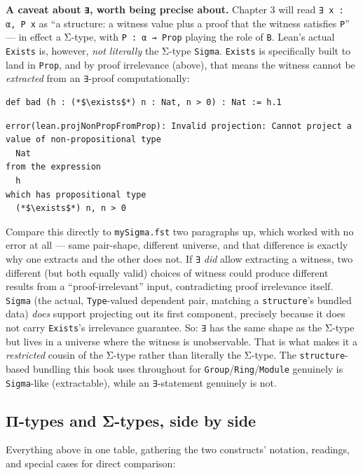 \textbf{A caveat about \texttt{∃}, worth being precise about.} Chapter 3 will read \texttt{∃ x : α, P x} as ``a structure: a witness value plus a proof that the witness satisfies \texttt{P}'' --- in effect a Σ-type, with \texttt{P : α → Prop} playing the role of \texttt{B}. Lean's actual \texttt{Exists} is, however, \emph{not literally} the Σ-type \texttt{Sigma}. \texttt{Exists} is specifically built to land in \texttt{Prop}, and by proof irrelevance (above), that means the witness cannot be \emph{extracted} from an \texttt{∃}-proof computationally:

\begin{lstlisting}
def bad (h : (*$\exists$*) n : Nat, n > 0) : Nat := h.1
\end{lstlisting}

\begin{lstlisting}
error(lean.projNonPropFromProp): Invalid projection: Cannot project a
value of non-propositional type
  Nat
from the expression
  h
which has propositional type
  (*$\exists$*) n, n > 0
\end{lstlisting}

Compare this directly to \texttt{mySigma.fst} two paragraphs up, which worked with no error at all --- same pair-shape, different universe, and that difference is exactly why one extracts and the other does not. If \texttt{∃} \emph{did} allow extracting a witness, two different (but both equally valid) choices of witness could produce different results from a ``proof-irrelevant'' input, contradicting proof irrelevance itself. \texttt{Sigma} (the actual, \texttt{Type}-valued dependent pair, matching a \texttt{structure}'s bundled data) \emph{does} support projecting out its first component, precisely because it does not carry \texttt{Exists}'s irrelevance guarantee. So: \texttt{∃} has the same shape as the Σ-type but lives in a universe where the witness is unobservable. That is what makes it a \emph{restricted} cousin of the Σ-type rather than literally the Σ-type. The \texttt{structure}-based bundling this book uses throughout for \texttt{Group}/\texttt{Ring}/\texttt{Module} genuinely is \texttt{Sigma}-like (extractable), while an \texttt{∃}-statement genuinely is not.

\subsection{Π-types and Σ-types, side by side}\label{sec:01-basics:05-pi-sigma-and-coc:5}

Everything above in one table, gathering the two constructs' notation, readings, and special cases for direct comparison:

